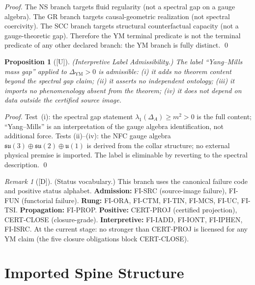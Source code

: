 \documentclass[12pt,oneside]{amsbook}
\theoremstyle{plain}
\newtheorem{proposition}[theorem]{Proposition}
\theoremstyle{definition}
\theoremstyle{remark}
\newtheorem{remark}[theorem]{Remark}
\newcommand{\status}[1]{\textup{[#1]}}
\begin{document}
\begin{proof}
The NS branch targets fluid regularity (not a spectral gap on a
gauge algebra). The GR branch targets causal-geometric
realization (not spectral coercivity). The SCC branch targets
structural counterfactual capacity (not a gauge-theoretic gap).
Therefore the YM terminal predicate is not the terminal predicate
of any other declared branch: the YM branch is fully distinct.
\qed
\end{proof}

\begin{proposition}[\status{U}]\label{prop:label-admissibility}
\textup{(Interpretive Label Admissibility.)} The label
``Yang--Mills mass gap'' applied to $\Delta_{\mathrm{YM}} > 0$
is admissible: (i) it adds no theorem content beyond the spectral
gap claim; (ii) it asserts no independent ontology; (iii) it
imports no phenomenology absent from the theorem; (iv) it does not
depend on data outside the certified source image.
\end{proposition}

\begin{proof}
Test~(i): the spectral gap statement $\lambda_1(\Delta_A) \geq m^2
> 0$ is the full content; ``Yang--Mills'' is an interpretation of
the gauge algebra identification, not additional force. Tests
(ii)--(iv): the NFC gauge algebra $\mathfrak{su}(3)\oplus\mathfrak{su}(2)
\oplus\mathfrak{u}(1)$ is derived from the collar structure; no
external physical premise is imported. The label is eliminable
by reverting to the spectral description.
\qed
\end{proof}

\begin{remark}[\status{D}]\label{rmk:status-vocab}
\textup{(Status vocabulary.)} This branch uses the canonical
failure code and positive status alphabet.
\textbf{Admission:} FI-SRC (source-image failure), FI-FUN
(functorial failure).
\textbf{Rung:} FI-ORA, FI-CTM, FI-TIN, FI-MCS, FI-UC, FI-TSI.
\textbf{Propagation:} FI-PROP.
\textbf{Positive:} CERT-PROJ (certified projection), CERT-CLOSE
(closure-grade).
\textbf{Interpretive:} FI-IADD, FI-IONT, FI-IPHEN, FI-ISRC.
At the current stage: no stronger than CERT-PROJ is licensed for
any YM claim (the five closure obligations block CERT-CLOSE).
\end{remark}

\section{Imported Spine Structure}
\label{sec:imports}
\end{document}
